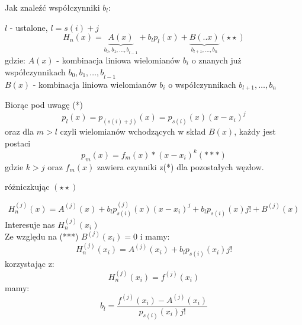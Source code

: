 \begin{frame}
Jak znaleźć współczynniki $b_{l}$:

$l$ - ustalone, $l=s(i)+j$
$$
H_{n}(x)=\underbrace{A(x)}_{b_{0},{b_{1},\ldots,b}_{l-1}}+b_{l}p_{l}(x)+\underbrace{B(..x)}_{b_{l+1},\ldots,b_{n}}(\star\star)
$$
gdzie:
$A(x)$ - kombinacja liniowa wielomianów $b_i$ o znanych już współczynnikach $b_{0},{b_{1},\ldots,b}_{l-1}$\\

\vspace{3mm}
$B(x)$ - kombinacja liniowa wielomianów $b_i$ o współczynnikach $b_{l+1},\ldots,b_{n}$
\end{frame}
\begin{frame}
Biorąc pod uwagę (*)
$$
p_{l}(x)=p_{(s(i)+j)}(x)=p_{s(i)}(x)(x-x_{i})^{j}
$$
oraz dla $m > l$ czyli wielomianów wchodzących w skład $B(x)$, każdy jest postaci
$$
p_{m}(x)=f_m(x)*(x-x_{i})^{k}(***)
$$
gdzie $k>j$ oraz $f_m(x)$ zawiera czynniki z(*) dla pozostałych węzłow. \\
\end{frame}
\begin{frame}
różniczkując $(\star\star)$

$$
H_{n}^{(j)}(x)=A^{(j)}(x)+b_{l}p^{(j)}_{s(i)}(x)(x-x_{i})^j+b_{l}p_{s(i)}(x)j!+B^{(j)}(x)
$$
Interesuje nas $H_{n}^{(j)}(x_{i})$\\
Ze względu na (***) $B^{(j)}(x_i)=0$ i mamy:
$$
H_{n}^{(j)}(x_{i})=A^{(j)}(x_{i})+b_{l}p_{s(i)}(x_{i})j!
$$
korzystając $\mathrm{z}$:
$$
H_{n}^{(j)}(x_{i})=f^{(j)}(x_{i})
$$
mamy:
$$
b_{l}=\frac{f^{(j)}(x_{i})-A^{(j)}(x_{i})}{p_{s(i)}(x_{i})j!}
$$

\end{frame}
